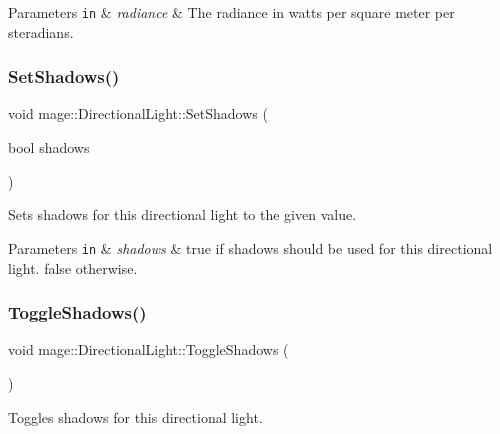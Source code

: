 \begin{DoxyParams}[1]{Parameters}
\mbox{\tt in}  & {\em radiance} & The radiance in watts per square meter per steradians. \\
\hline
\end{DoxyParams}
\hypertarget{classmage_1_1_directional_light_ab70b4298dc6616dbe22446e8e3298424}{}\label{classmage_1_1_directional_light_ab70b4298dc6616dbe22446e8e3298424} 
\subsubsection{\texorpdfstring{Set\+Shadows()}{SetShadows()}}
{\footnotesize\ttfamily void mage\+::\+Directional\+Light\+::\+Set\+Shadows (\begin{DoxyParamCaption}\item[{bool}]{shadows }\end{DoxyParamCaption})\hspace{0.3cm}{\ttfamily [noexcept]}}

Sets shadows for this directional light to the given value.


\begin{DoxyParams}[1]{Parameters}
\mbox{\tt in}  & {\em shadows} & {\ttfamily true} if shadows should be used for this directional light. {\ttfamily false} otherwise. \\
\hline
\end{DoxyParams}
\hypertarget{classmage_1_1_directional_light_a1c15d8e42526ed5ae7568cff5c7b25e0}{}\label{classmage_1_1_directional_light_a1c15d8e42526ed5ae7568cff5c7b25e0} 
\subsubsection{\texorpdfstring{Toggle\+Shadows()}{ToggleShadows()}}
{\footnotesize\ttfamily void mage\+::\+Directional\+Light\+::\+Toggle\+Shadows (\begin{DoxyParamCaption}{ }\end{DoxyParamCaption})\hspace{0.3cm}{\ttfamily [noexcept]}}

Toggles shadows for this directional light. \hypertarget{classmage_1_1_directional_light_a645e7f3d3e4dc4ebf11d7a6aa6950a18}{}\label{classmage_1_1_directional_light_a645e7f3d3e4dc4ebf11d7a6aa6950a18} 
